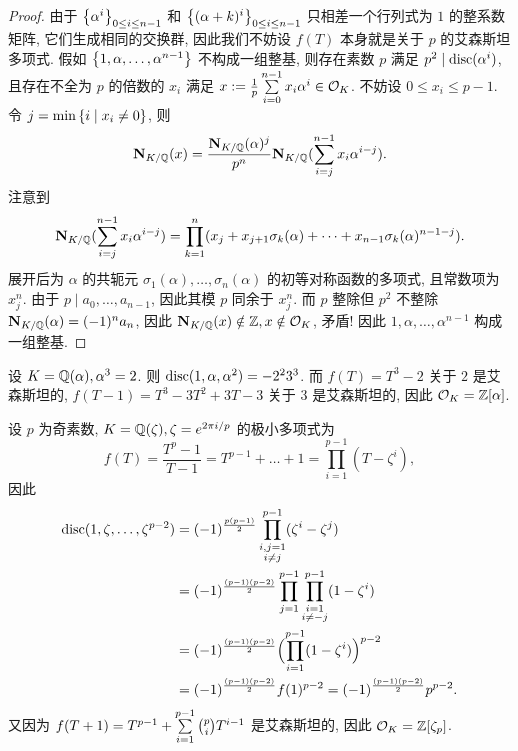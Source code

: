 \begin{proof}
由于 $\left\{\alpha^i\right\}_{0\le i\le n-1}$ 和 $\left\{(\alpha+k)^i\right\}_{0\le i\le n-1}$ 只相差一个行列式为 $1$ 的整系数矩阵, 它们生成相同的交换群, 因此我们不妨设 $f(T)$ 本身就是关于 $p$ 的艾森斯坦多项式.
假如 $\left\{1,\alpha,\dots,\alpha^{n-1}\right\}$ 不构成一组整基, 则存在素数 $p$ 满足 $p^2\mid {\mathrm{disc}}(\alpha^i)$, 且存在不全为 $p$ 的倍数的 $x_i$ 满足 $x:=\frac{1}{p}\sum\limits_{i=0}^{n-1} x_i\alpha^i \in {\mathcal{O}}_K$. 不妨设 $0\le x_i\le p-1$. 令 $j=\min\left\{i\mid x_i\neq 0\right\}$, 则
  \[{\mathbf{N}}_{K/{\mathbb{Q}}}(x)=\frac{{\mathbf{N}}_{K/{\mathbb{Q}}}(\alpha)^j}{p^n}{\mathbf{N}}_{K/{\mathbb{Q}}}(\sum_{i=j}^{n-1}x_i\alpha^{i-j}).\]
注意到
  \[{\mathbf{N}}_{K/{\mathbb{Q}}}(\sum_{i=j}^{n-1}x_i\alpha^{i-j})=\prod_{k=1}^n(x_j+x_{j+1}\sigma_k(\alpha)+\dots+x_{n-1}\sigma_k(\alpha)^{n-1-j}).\]
展开后为 $\alpha$ 的共轭元 $\sigma_1(\alpha),\dots,\sigma_n(\alpha)$ 的初等对称函数的多项式, 且常数项为 $x_j^n$. 由于 $p\mid a_0,\dots,a_{n-1}$, 因此其模 $p$ 同余于 $x_j^n$. 而 $p$ 整除但 $p^2$ 不整除 ${\mathbf{N}}_{K/{\mathbb{Q}}}(\alpha)=(-1)^n a_n$, 因此 ${\mathbf{N}}_{K/{\mathbb{Q}}}(x)\notin{\mathbb{Z}},x\notin {\mathcal{O}}_K$, 矛盾! 因此 $1,\alpha,\dots,\alpha^{n-1}$ 构成一组整基.
\end{proof}

\begin{example}
设 $K={\mathbb{Q}}(\alpha),\alpha^3=2$. 则 ${\mathrm{disc}}(1,\alpha,\alpha^2)=-2^2 3^3$. 而 $f(T)=T^3-2$ 关于 $2$ 是艾森斯坦的, $f(T-1)=T^3-3T^2+3T-3$ 关于 $3$ 是艾森斯坦的, 因此 ${\mathcal{O}}_K={\mathbb{Z}}[\alpha]$.
\end{example}

\begin{example}\label{exe:cyclo_p}
设 $p$ 为奇素数, $K={\mathbb{Q}}(\zeta),\zeta=e^{2\pi i/p}$ 的极小多项式为
  \[f(T)=\frac{T^p-1}{T-1}=T^{p-1}+\dots+1=\prod\limits_{i=1}^{p-1}(T-\zeta^i),\]
因此
\begin{align*}
{\mathrm{disc}}(1,\zeta,\dots,\zeta^{p-2})&=(-1)^{\frac{p(p-1)}{2}}\prod_{\substack{i,j=1\\ i\neq j}}^{p-1}(\zeta^i-\zeta^j)\\
&=(-1)^{\frac{(p-1)(p-2)}{2}}\prod_{j=1}^{p-1}\prod_{\substack{i=1\\ i\neq-j}}^{p-1}(1-\zeta^i)\\
&=(-1)^{\frac{(p-1)(p-2)}{2}}\Bigl(\prod_{i=1}^{p-1}(1-\zeta^i)\Bigr)^{p-2}\\
&=(-1)^{\frac{(p-1)(p-2)}{2}}f(1)^{p-2}=(-1)^{\frac{(p-1)(p-2)}{2}}p^{p-2}.
\end{align*}
又因为 $f(T+1)=T^{p-1}+\sum\limits_{i=1}^{p-1}{p\choose i}T^{i-1}$ 是艾森斯坦的, 因此 ${\mathcal{O}}_K={\mathbb{Z}}[\zeta_p]$.
\end{example}

